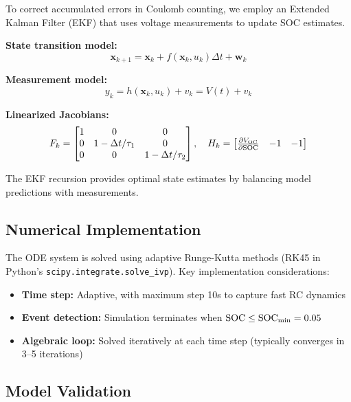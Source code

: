 To correct accumulated errors in Coulomb counting, we employ an Extended Kalman Filter (EKF) that uses voltage measurements to update SOC estimates.

\textbf{State transition model:}
\begin{equation}
    \mathbf{x}_{k+1} = \mathbf{x}_k + f(\mathbf{x}_k, u_k) \Delta t + \mathbf{w}_k
\end{equation}

\textbf{Measurement model:}
\begin{equation}
    y_k = h(\mathbf{x}_k, u_k) + v_k = V(t) + v_k
\end{equation}

\textbf{Linearized Jacobians:}
\begin{equation}
    F_k = \begin{bmatrix}
        1 & 0 & 0 \\
        0 & 1 - \Delta t/\tau_1 & 0 \\
        0 & 0 & 1 - \Delta t/\tau_2
    \end{bmatrix}, \quad
    H_k = \begin{bmatrix}
        \frac{\partial V_{\text{OC}}}{\partial \text{SOC}} & -1 & -1
    \end{bmatrix}
\end{equation}

The EKF recursion provides optimal state estimates by balancing model predictions with measurements.

\subsection{Numerical Implementation}
\label{subsec:numerical}

The ODE system is solved using adaptive Runge-Kutta methods (RK45 in Python's \texttt{scipy.integrate.solve\_ivp}). Key implementation considerations:

\begin{itemize}
    \item \textbf{Time step:} Adaptive, with maximum step 10s to capture fast RC dynamics
    \item \textbf{Event detection:} Simulation terminates when $\text{SOC} \leq \text{SOC}_{\min} = 0.05$
    \item \textbf{Algebraic loop:} Solved iteratively at each time step (typically converges in 3--5 iterations)
\end{itemize}

\subsection{Model Validation}
\label{subsec:validation}

